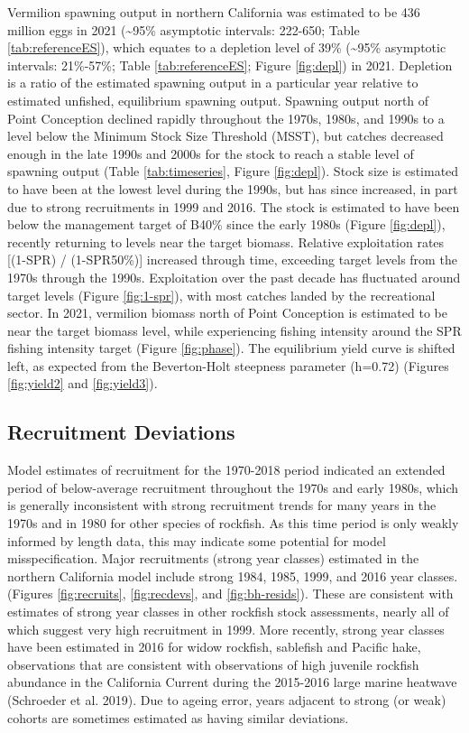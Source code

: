 \documentclass[
  english,
  a4paper,
]{article}
\begin{document}
Vermilion spawning output in northern California was estimated to be 436 million eggs in 2021 (\textasciitilde95\% asymptotic intervals: 222-650; Table \ref{tab:referenceES}), which equates to a depletion level of 39\% (\textasciitilde95\% asymptotic intervals: 21\%-57\%; Table \ref{tab:referenceES}; Figure \ref{fig:depl}) in 2021. Depletion is a ratio of the estimated spawning output in a particular year relative to estimated unfished, equilibrium spawning output. Spawning output north of Point Conception declined rapidly throughout the 1970s, 1980s, and 1990s to a level below the Minimum Stock Size Threshold (MSST), but catches decreased enough in the late 1990s and 2000s for the stock to reach a stable level of spawning output (Table \ref{tab:timeseries}, Figure \ref{fig:depl}). Stock size is estimated to have been at the lowest level during the 1990s, but has since increased, in part due to strong recruitments in 1999 and 2016. The stock is estimated to have been below the management target of B40\% since the early 1980s (Figure \ref{fig:depl}), recently returning to levels near the target biomass. Relative exploitation rates {[}(1-SPR) / (1-SPR50\%){]} increased through time, exceeding target levels from the 1970s through the 1990s. Exploitation over the past decade has fluctuated around target levels (Figure \ref{fig:1-spr}), with most catches landed by the recreational sector. In 2021, vermilion biomass north of Point Conception is estimated to be near the target biomass level, while experiencing fishing intensity around the SPR fishing intensity target (Figure \ref{fig:phase}). The equilibrium yield curve is shifted left, as expected from the Beverton-Holt steepness parameter (h=0.72) (Figures \ref{fig:yield2} and \ref{fig:yield3}).

\hypertarget{recruitment-deviations}{%
\subsection{Recruitment Deviations}\label{recruitment-deviations}}

Model estimates of recruitment for the 1970-2018 period indicated an extended period of below-average recruitment throughout the 1970s and early 1980s, which is generally inconsistent with strong recruitment trends for many years in the 1970s and in 1980 for other species of rockfish. As this time period is only weakly informed by length data, this may indicate some potential for model misspecification. Major recruitments (strong year classes) estimated in the northern California model include strong 1984, 1985, 1999, and 2016 year classes. (Figures \ref{fig:recruits}, \ref{fig:recdevs}, and \ref{fig:bh-resids}). These are consistent with estimates of strong year classes in other rockfish stock assessments, nearly all of which suggest very high recruitment in 1999. More recently, strong year classes have been estimated in 2016 for widow rockfish, sablefish and Pacific hake, observations that are consistent with observations of high juvenile rockfish abundance in the California Current during the 2015-2016 large marine heatwave (Schroeder et al. 2019). Due to ageing error, years adjacent to strong (or weak) cohorts are sometimes estimated as having similar deviations.
\end{document}
